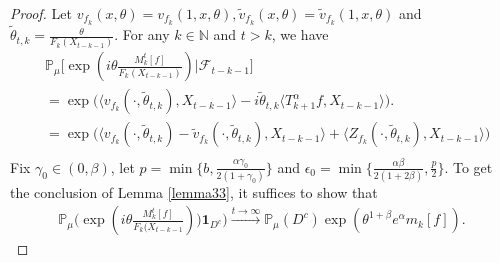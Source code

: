 \documentclass[12pt,oneside,english]{amsart}
\theoremstyle{plain}
\theoremstyle{definition}
\numberwithin{equation}{section}
\begin{document}
 \begin{proof}
     Let $v_{f_k}(x,\theta)=v_{f_k}(1,x,\theta),\tilde{v}_{f_k}(x,\theta)=\tilde{v}_{f_k}(1,x,\theta)$ and $\tilde{\theta}_{t,k}=\frac{\theta}{F_k(X_{t-k-1})}$. For any $k\in\mathbb{N}$ and $t>k$, we have
         \begin{align}
        &\mathbb{P}_{\mu}\big[\exp(i\theta\frac {M_k^t[f]}{F_k(X_{t-k-1})})\big|\mathcal{F}_{t-k-1}\big]\\
        &=\exp\big(\langle v_{f_k}(\cdot,\tilde{\theta}_{t,k}),X_{t-k-1}\rangle-i\tilde{\theta}_{t,k}\langle T_{k+1}^{\alpha}f, X_{t-k-1}\rangle\big).\\
        \label{condition mean}
        &=\exp\big(\langle v_{f_k}(\cdot,\tilde{\theta}_{t,k})-\tilde{v}_{f_k}(\cdot, \tilde{\theta}_{t,k}),X_{t-k-1}\rangle+\langle Z_{f_k}(\cdot,\tilde{\theta}_{t,k}),X_{t-k-1}\rangle\big)\\
       \end{align}
         Fix $\gamma_0\in (0,\beta)$, let $p=\min\{b,\frac{\alpha\gamma_0}{2(1+\gamma_0)}\}$ and $\epsilon_0=\min\{\frac{\alpha\beta}{2(1+2\beta)},\frac{p}{2}\}$.
       To get the conclusion of Lemma \ref{lemma33}, it suffices to show that
       \begin{align}
           \mathbb{P}_{\mu}\Big(\exp(i\theta\frac{M_k^t[f]}{F_k(X_{t-k-1}}))\mathbf{1}_{D^c}\Big)\xrightarrow{t\rightarrow \infty}\mathbb{P}_{\mu}(D^c)\exp(\theta^{1+\beta}e^{\alpha}m_k[f]).
       \end{align}
\end{proof}
\end{document}
